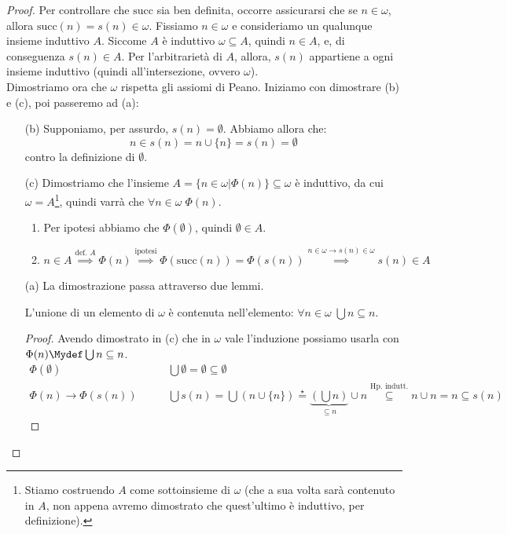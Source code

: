 \documentclass[11pt]{scrartcl}
\begin{document}
\begin{proof}
	Per controllare che $\text{succ}$ sia ben definita, occorre assicurarsi che se $n \in \omega$, allora $\text{succ}(n) = s(n) \in \omega$. Fissiamo $n \in \omega$
	e consideriamo un qualunque insieme induttivo $A$. Siccome $A$ è induttivo $\omega \subseteq A$, quindi $n \in A$, e, di conseguenza $s(n) \in A$. Per 
	l'arbitrarietà di $A$, allora, $s(n)$ appartiene a ogni insieme induttivo (quindi all'intersezione, ovvero $\omega$).\\
	Dimostriamo ora che $\omega$ rispetta gli assiomi di Peano. Iniziamo con dimostrare (b) e (c), poi passeremo ad (a):
	\begin{enumerate}
		\item[(b)] Supponiamo, per assurdo, $s(n) = \emptyset$. Abbiamo allora che:
		\[ n \in s(n) =  n \cup \{n\} = s(n) = \emptyset
			\]
		contro la definizione di $\emptyset$.
		\item[(c)] Dimostriamo che l'insieme $A = \{n \in \omega | \Phi(n)\} \subseteq \omega$ è induttivo, da cui $\omega = A$\footnote{Stiamo costruendo $A$ come sottoinsieme di $\omega$ (che
		a sua volta sarà contenuto in $A$, non appena avremo dimostrato che quest'ultimo è induttivo, per definizione).}, quindi varrà che $\forall n \in \omega \; \Phi(n)$.
		\begin{enumerate}[(1)]
			\item Per ipotesi abbiamo che $\Phi(\emptyset)$, quindi $\emptyset \in A$.
			\item $n \in A \overset{\text{def. $A$}}{\implies} \Phi(n) \overset{\text{ipotesi}}{\implies} \Phi(\text{succ}(n)) = \Phi(s(n)) \overset{\text{$n \in \omega \rightarrow s(n) \in \omega$}}{\implies} s(n) \in A$
		\end{enumerate}
		\item[(a)] La dimostrazione passa attraverso due lemmi.
					\begin{lemma}
					[Lemma 1]
					L'unione di un elemento di $\omega$ è contenuta nell'elemento: $\forall n \in \omega \; \bigcup n \subseteq n$.
					\end{lemma}
					\begin{proof}
						Avendo dimostrato in (c) che in $\omega$ vale l'induzione possiamo usarla con $\Phi(n) \Mydef \bigcup n \subseteq n$. 
						\[
							\begin{split}
							\boxed{\Phi(\emptyset)} & \qquad \bigcup \emptyset = \emptyset \subseteq \emptyset \\
							\boxed{\Phi(n) \rightarrow \Phi(s(n))} & \qquad \bigcup s(n) = \bigcup(n \cup \{n\}) \overset{\star}{=} \underbrace{\left(\bigcup n\right)}_{\subseteq n} \cup n \overset{\text{Hp. indutt.}}{\subseteq} n \cup n = n \subseteq s(n)

\end{split}\]
\end{proof}
\end{enumerate}
\end{proof}
\end{document}
